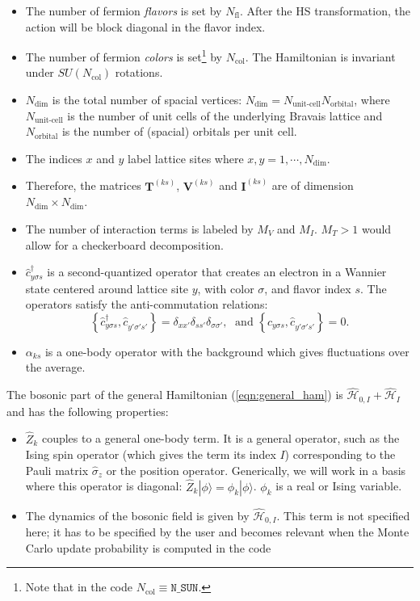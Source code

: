 \begin{itemize}
\item The number of fermion \emph{flavors} is set by $N_{\mathrm{fl}}$.  After the HS transformation, the action will be block diagonal in the flavor index. 
\item The number of fermion \emph{colors} is set\footnote{Note that  in the code $ N_{\mathrm{col}} \equiv \texttt{N\_{SUN}} $.} by $N_{\mathrm{col}}$.    The Hamiltonian is invariant under  $SU(N_{\mathrm{col}})$  rotations.
\item $N_{\mathrm{dim}}$ is the total number of spacial vertices: $N_{\mathrm{dim}}=N_{\text{unit-cell}} N_{\mathrm{orbital}}$, where $N_{\text{unit-cell}}$ is the number of unit cells of the underlying Bravais lattice and $N_{\mathrm{orbital}}$ is the number of (spacial) orbitals per unit cell.
\item The indices $x$ and $y$ label lattice sites where $x,y=1,\cdots, N_{\mathrm{dim}}$. 
\item Therefore, the  matrices $\bm{T}^{(k s)}$, $\bm{V}^{(ks)}$  and $\bm{I}^{(ks)}$ are  of dimension $N_{\mathrm{dim}}\times N_{\mathrm{dim}}$.
\item The number of interaction terms  is labeled by $M_V$   and $M_I$.   $M_T> 1 $ would allow for a checkerboard decomposition.
\item $\hat{c}^{\dagger}_{y \sigma s} $ is a second-quantized operator that creates an electron in a Wannier state centered around lattice site $y$, with color $\sigma$, and  flavor index $s$.  The operators satisfy the anti-commutation relations: 
\begin{equation}
	\left\{ \hat{c}^{\dagger}_{y \sigma s},    \hat{c}^{\phantom\dagger}_{y' \sigma' s'}  \right\}   =   \delta_{xx'}  \delta_{ss'} \delta_{\sigma\sigma'},   
	\; \text{ and } \left\{ \hat{c}^{\phantom\dagger}_{y \sigma s},    \hat{c}^{\phantom\dagger}_{y' \sigma' s'}  \right\}   =0.
\end{equation}
\item $\alpha_{k s}$ is a one-body operator with the background which gives fluctuations over the average.

\end{itemize}
The bosonic  part of the general Hamiltonian (\ref{eqn:general_ham}) is $\hat{\mathcal{H}}_{0,I}+ \hat{\mathcal{H}}_{I}$ and  has the following properties:
\begin{itemize}
\item $\hat{Z}_k$ couples to a general one-body term. It is a general operator, such as the Ising spin operator (which gives the term its index $I$) corresponding to the Pauli matrix $\hat{\sigma}_{z}$ or the position operator.  Generically,  we will work in a basis where this operator is diagonal:  $\hat{Z}_k | \phi \rangle  =  \phi_k | \phi \rangle $. $\phi_k$ is a real   or Ising variable. 
\item  The dynamics of the bosonic field  is given by $\hat{\mathcal{H}}_{0,I}$. This term is not specified here; 
it has to be specified by the user and becomes relevant when the Monte Carlo update probability is computed in the code
\end{itemize}
